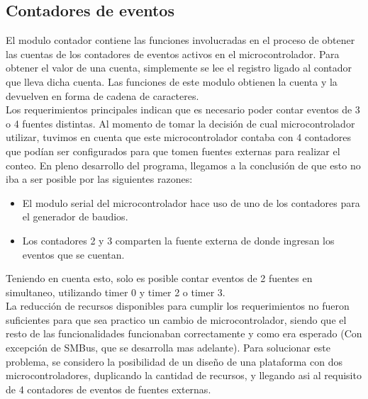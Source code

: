 

\subsection{Contadores de eventos} %
\label{it2:sub:contadores_de_eventos}


El modulo contador contiene las funciones involucradas en el proceso de obtener las cuentas de los contadores de eventos activos en el microcontrolador. Para obtener el valor de una cuenta, simplemente se lee el registro ligado al contador que lleva dicha cuenta. Las funciones de este modulo obtienen la cuenta y la devuelven en forma de cadena de caracteres. \\

Los requerimientos principales indican que es necesario poder contar eventos de 3 o 4 fuentes distintas. Al momento de tomar la decisión de cual microcontrolador utilizar, tuvimos en cuenta que este microcontrolador contaba con 4 contadores que podían ser configurados para que tomen fuentes externas para realizar el conteo. En pleno desarrollo del programa, llegamos a la conclusión de que esto no iba a ser posible por las siguientes razones:

\begin{itemize}
  \item El modulo serial del microcontrolador hace uso de uno de los contadores para el generador de baudios.
  \item Los contadores 2 y 3 comparten la fuente externa de donde ingresan los eventos que se cuentan.
\end{itemize}

Teniendo en cuenta esto, solo es posible contar eventos de 2 fuentes en simultaneo, utilizando timer 0 y timer 2 o timer 3. \\

La reducción de recursos disponibles para cumplir los requerimientos no fueron suficientes para que sea practico un cambio de microcontrolador, siendo que el resto de las funcionalidades funcionaban correctamente y como era esperado (Con excepción de SMBus, que se desarrolla mas adelante). Para solucionar este problema, se considero la posibilidad de un diseño de una plataforma con dos microcontroladores, duplicando la cantidad de recursos, y llegando asi al requisito de 4 contadores de eventos de fuentes externas.

